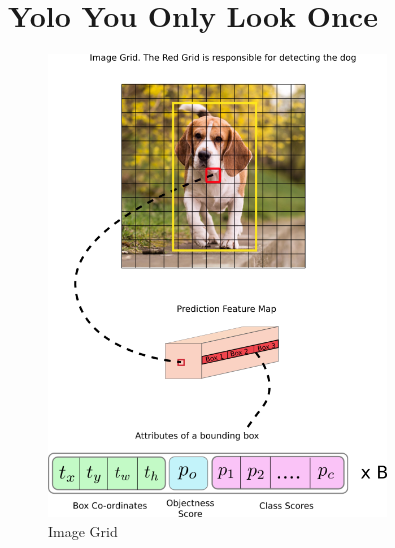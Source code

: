 \section{Yolo You Only Look Once}

\begin{figure}
  \centering
  \includegraphics[width=0.8\textwidth]{images/yolo/grid.png}
  \caption{Image Grid}
\end{figure}

